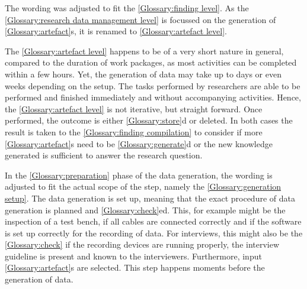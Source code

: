\documentclass{bausteinefdm}
\begin{document}

The wording was adjusted to fit the \ref{Glossary:finding level}.
As the \ref{Glossary:research data management level} is focussed on the generation of \ref{Glossary:artefact}s, it is renamed to \ref{Glossary:artefact level}.

The \ref{Glossary:artefact level} happens to be of a very short nature in general, compared to the duration of work packages, as most activities can be completed within a few hours.
Yet, the generation of data may take up to days or even weeks depending on the setup.
The tasks performed by researchers are able to be performed and finished immediately and without accompanying activities.
Hence, the \ref{Glossary:artefact level} is not iterative, but straight forward.
Once performed, the outcome is either \ref{Glossary:store}d or deleted. 
In both cases the result is taken to the \ref{Glossary:finding compilation} to consider if more \ref{Glossary:artefact}s need to be \ref{Glossary:generate}d or the new knowledge generated is sufficient to answer the research question.


In the \ref{Glossary:preparation} phase of the data generation, the wording is adjusted to fit the actual scope of the step, namely the \ref{Glossary:generation setup}.
The data generation is set up, meaning that the exact procedure of data generation is planned and \ref{Glossary:check}ed. This, for example might be the inspection of a test bench, if all cables are connected correctly and if the software is set up correctly for the recording of data.
For interviews, this might also be the \ref{Glossary:check} if the recording devices are running properly, the interview guideline is present and known to the interviewers.
Furthermore, input \ref{Glossary:artefact}s are selected.
This step happens moments before the generation of data.
\end{document}
